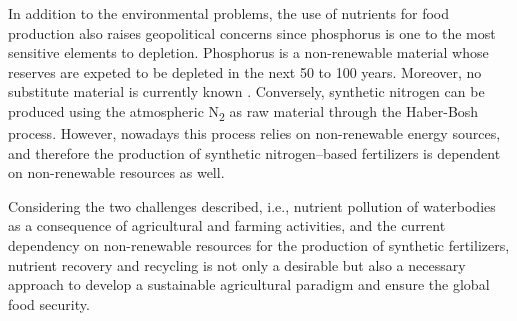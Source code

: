 \begin{refsection}[referencesCh1]
In addition to the environmental problems, the use of nutrients for food production also raises geopolitical concerns since phosphorus is one to the most sensitive elements to depletion. Phosphorus is a non-renewable material whose reserves are expeted to be depleted in the next 50 to 100 years. Moreover, no substitute material is currently known \citep{cordell2009story}. Conversely, synthetic nitrogen can be produced using the atmospheric N\textsubscript{2} as raw material through the Haber-Bosh process. However, nowadays this process relies on non-renewable energy sources, and therefore the production of synthetic nitrogen--based fertilizers is dependent on non-renewable resources as well.

Considering the two challenges described, i.e., nutrient pollution of waterbodies as a consequence of agricultural and farming activities, and the current dependency on non-renewable resources for the production of synthetic fertilizers, nutrient recovery and recycling is not only a desirable but also a necessary approach to develop a sustainable agricultural paradigm and ensure the global food security.


\end{refsection}
